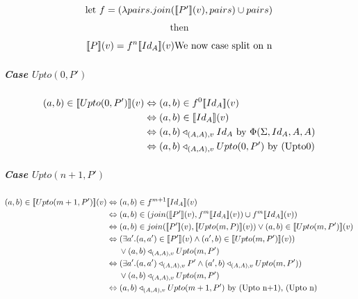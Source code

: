 \documentclass[12pt,a4paper,twoside,openright]{report}
\newcommand{\db}[1]{{\bf [\![}#1{\bf ]\!]}}
\newcommand{\deno}[1]{\db{#1}(v)}
\newcommand{\denoRule}[2]{#1 \in \deno{#2}}
\newcommand{\opRule}[3]{#1 \triangleleft_{#2, v} #3}
\newcommand{\phiRule}[3]{\Phi(\Sigma, #1, #2, #3)}
\let\oldsubparagraph\subparagraph
\renewcommand{\subparagraph}[1]{\oldsubparagraph{#1}\mbox{}}
\begin{document}
\begin{equation}
\label{fDefUpto}
\mbox{let $f = (\lambda pairs. join(\deno{P'}, pairs) \cup pairs)$}\end{equation}
$$\mbox{then}$$

\begin{equation}
\deno{P} = f^n\deno{Id_A}\\
\mbox{We now case split on n}
\end{equation}

\subparagraph{Case $Upto(0, P')$}

\begin{equation}
\begin{split}
\denoRule{(a,b)}{Upto(0, P')} & \Leftrightarrow (a, b) \in f^0 \deno{Id_A} \\
							  & \Leftrightarrow (a, b) \in \deno{Id_A}\\ 
							  & \Leftrightarrow \opRule{(a, b)}{(A, A)}{Id_A} \mbox{    by $\phiRule{Id_A}{A}{A}$}\\ 
							  & \Leftrightarrow \opRule{(a, b)}{(A, A)}{Upto(0, P')} \mbox{    by (Upto0)}\\ 
\end{split}
\end{equation}

\subparagraph{Case $Upto(n+1, P')$}

\begin{equation}
\begin{split}
\denoRule{(a,b)}{Upto(m + 1, P')} & \Leftrightarrow (a, b) \in f^{m+1} \deno{Id_A} \\
							  & \Leftrightarrow (a, b) \in (join(\deno{P'}, f^{m} \deno{Id_A}) \cup f^{m} \deno{Id_A})\\ 
							  & \Leftrightarrow (a, b) \in join(\deno{P'}, \deno{Upto(m, P)}) \vee (a, b) \in \deno{Upto(m, P')}\\ 
							  & \Leftrightarrow (\exists a'.\denoRule{(a, a')}{P'} \wedge \denoRule{(a', b)}{Upto(m, P')}) \\
							  & \indent \vee \opRule{(a, b)}{(A, A)}{Upto(m, P')}\\ 
							  & \Leftrightarrow (\exists a'.\opRule{(a, a')}{(A, A)}{P'} \wedge \opRule{(a', b)}{(A, A)}{Upto(m, P')}) \\
							  & \indent \vee \opRule{(a, b)}{(A, A)}{Upto(m, P')}\\ 
							  & \Leftrightarrow \opRule{(a, b)}{(A, A)}{Upto(m+1, P')}\mbox{   by (Upto n+1), (Upto n)}
\end{split}
\end{equation}
\end{document}
